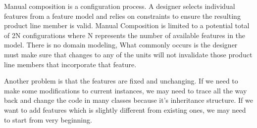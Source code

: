 Manual composition is a configuration process. A designer selects individual features from a feature model and
relies on constraints to ensure the resulting product line member is valid. Manual Composition is limited to a
potential total of 2N configurations where N represents the number of available features in the model. There is no
 domain modeling, What commonly occurs is the designer must make sure that changes to any of the units will not invalidate those product
 line members that incorporate that feature.

 Another problem is that the features are fixed and unchanging. If we need to make some modifications to current
 instances, we may need to trace all the way back and change the code in many classes because it’s inheritance
 structure. If we want to add features which is slightly different from existing ones, we may need to start from
 very beginning.
